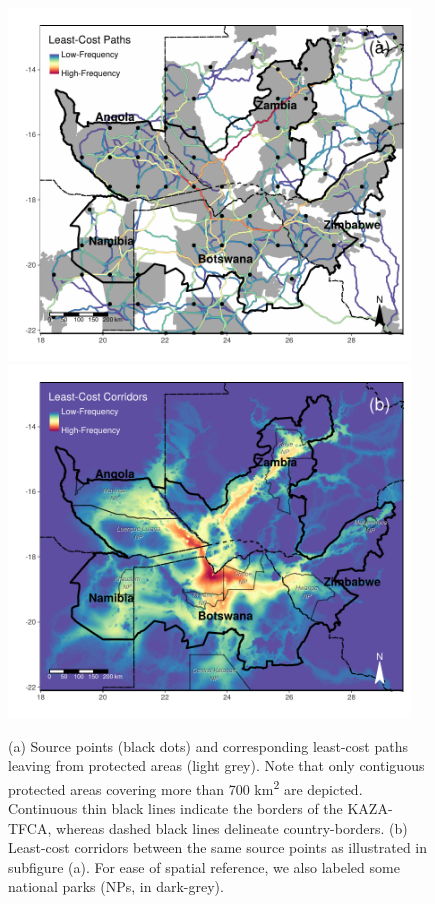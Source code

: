 \documentclass[abstract=on,10pt,a4paper,bibliography=totocnumbered]{article}
\begin{document}
\begin{figure}[hbtp]
  \begin{center}
    \begin{minipage}{0.95\textwidth}
      \includegraphics[width = 0.95\textwidth]{99_LeastCostPaths.pdf}
      \includegraphics[width = 0.95\textwidth]{99_LeastCostCorrs.pdf}
    \end{minipage}
    \caption{(a) Source points (black dots) and corresponding least-cost paths
    leaving from protected areas (light grey). Note that only contiguous
    protected areas covering more than 700 km\textsuperscript{2} are depicted.
    Continuous thin black lines indicate the borders of the KAZA-TFCA, whereas
    dashed black lines delineate country-borders. (b) Least-cost corridors
    between the same source points as illustrated in subfigure (a). For ease of
    spatial reference, we also labeled some national parks (NPs, in dark-grey).}
    \label{LeastCost}
  \end{center}
\end{figure}
\end{document}
